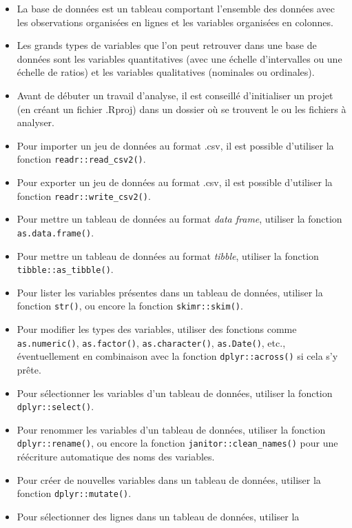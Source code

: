 \documentclass[
  letterpaper,
]{book}
\providecommand{\tightlist}{%
  \setlength{\itemsep}{0pt}\setlength{\parskip}{0pt}}\usepackage{longtable,booktabs,array}
\begin{document}
\begin{itemize}
\tightlist
\item
  La base de données est un tableau comportant l'ensemble des données
  avec les observations organisées en lignes et les variables organisées
  en colonnes.
\item
  Les grands types de variables que l'on peut retrouver dans une base de
  données sont les variables quantitatives (avec une échelle
  d'intervalles ou une échelle de ratios) et les variables qualitatives
  (nominales ou ordinales).
\item
  Avant de débuter un travail d'analyse, il est conseillé d'initialiser
  un projet (en créant un fichier .Rproj) dans un dossier où se trouvent
  le ou les fichiers à analyser.
\item
  Pour importer un jeu de données au format .csv, il est possible
  d'utiliser la fonction \texttt{readr::read\_csv2()}.
\item
  Pour exporter un jeu de données au format .csv, il est possible
  d'utiliser la fonction \texttt{readr::write\_csv2()}.
\item
  Pour mettre un tableau de données au format \emph{data frame},
  utiliser la fonction \texttt{as.data.frame()}.
\item
  Pour mettre un tableau de données au format \emph{tibble}, utiliser la
  fonction \texttt{tibble::as\_tibble()}.
\item
  Pour lister les variables présentes dans un tableau de données,
  utiliser la fonction \texttt{str()}, ou encore la fonction
  \texttt{skimr::skim()}.
\item
  Pour modifier les types des variables, utiliser des fonctions comme
  \texttt{as.numeric()}, \texttt{as.factor()}, \texttt{as.character()},
  \texttt{as.Date()}, etc., éventuellement en combinaison avec la
  fonction \texttt{dplyr::across()} si cela s'y prête.
\item
  Pour sélectionner les variables d'un tableau de données, utiliser la
  fonction \texttt{dplyr::select()}.
\item
  Pour renommer les variables d'un tableau de données, utiliser la
  fonction \texttt{dplyr::rename()}, ou encore la fonction
  \texttt{janitor::clean\_names()} pour une réécriture automatique des
  noms des variables.
\item
  Pour créer de nouvelles variables dans un tableau de données, utiliser
  la fonction \texttt{dplyr::mutate()}.
\item
  Pour sélectionner des lignes dans un tableau de données, utiliser la

\end{itemize}
\end{document}
